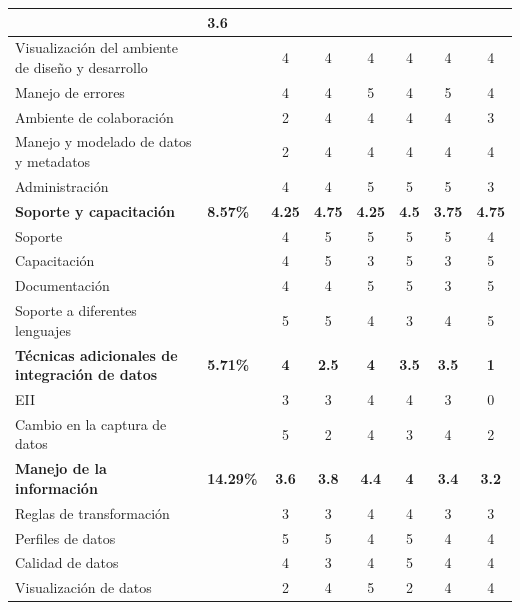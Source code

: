\begin{table}[htbp]
\begin{center}
{\begin{tabular}{|p{5.5cm}|>{\centering\arraybackslash}m{1.7cm}|c|c|c|c|c|c|}
        & \textbf{3.6} \\
        \hline
        Visualización del ambiente de diseño y desarrollo
        & & 4 & 4 & 4 & 4 & 4 & 4 \\
        \hline
        Manejo de errores & & 4 & 4 & 5 & 4 & 5 & 4\\
        \hline
        Ambiente de colaboración & & 2 & 4 & 4 & 4 & 4 & 3\\
        \hline
        Manejo y modelado de datos y metadatos & & 2 & 4 & 4 & 4 & 4 & 4 \\
        \hline
        Administración & & 4 & 4 & 5 & 5 & 5 & 3\\
        \hline
        \rowcolor[gray]{0.9}\textbf{Soporte y capacitación}
        & \textbf{8.57\%}
        & \textbf{4.25}
        & \textbf{4.75}
        & \textbf{4.25}
        & \textbf{4.5}
        & \textbf{3.75}
        & \textbf{4.75}\\
        \hline
        Soporte & & 4 & 5 & 5 & 5 & 5 & 4 \\
        \hline
        Capacitación & & 4 & 5 & 3 & 5 & 3 & 5 \\
        \hline
        Documentación & & 4 & 4 & 5 & 5 & 3 & 5 \\
        \hline
        Soporte a diferentes lenguajes & & 5 & 5 & 4 & 3 & 4 & 5 \\
        \hline
        \rowcolor[gray]{0.9}\textbf{Técnicas adicionales de integración de
        datos}
        & \textbf{5.71\%}
        &\textbf{ 4}
        & \textbf{2.5}
        & \textbf{4}
        & \textbf{3.5}
        & \textbf{3.5} & \textbf{1} \\
        \hline
        EII & & 3 & 3 & 4 & 4 & 3 & 0 \\
        \hline
        Cambio en la captura de datos & & 5 & 2 & 4 & 3 & 4 & 2 \\
        \hline
        \rowcolor[gray]{0.9}\textbf{Manejo de la información}
        & \textbf{14.29\%}
        & \textbf{3.6}
        & \textbf{3.8}
        & \textbf{4.4}
        & \textbf{4}
        & \textbf{3.4}
        & \textbf{3.2} \\
        \hline
        Reglas de transformación & & 3 & 3 & 4 & 4 & 3 & 3 \\
        \hline
        Perfiles de datos & & 5 & 5 & 4 & 5 & 4 & 4 \\
        \hline
        Calidad de datos & & 4 & 3 & 4 & 5 & 4 & 4 \\
        \hline
        Visualización de datos & & 2 & 4 & 5 & 2 & 4 & 4 \\

\end{tabular}}
\end{center}
\end{table}
